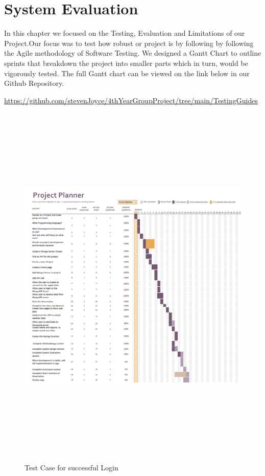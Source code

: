 \chapter{System Evaluation}
In this chapter we focused on the Testing, Evaluation and Limitations of our Project.Our focus was to test how robust or project is by following by following the Agile methodology of Software Testing. We designed a Gantt Chart to outline sprints that breakdown the project into smaller parts which in turn, would be vigorously tested. The full Gantt chart can be viewed on the link below in our Github Repository.
\newline

\url{https://github.com/stevenJoyce/4thYearGroupProject/tree/main/TestingGuides}

\begin{figure}[H]
    \centering
    \includegraphics[width=15cm, height = 18cm]{img/Gantt.PNG}
    \caption{Test Case for successful Login}
    \label{fig:altas config}
\end{figure}

